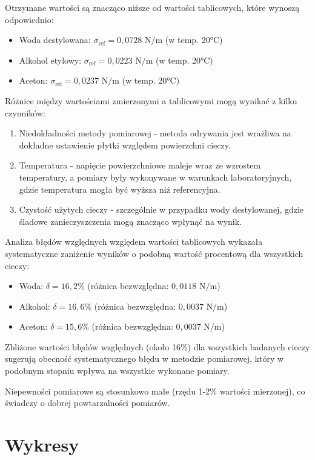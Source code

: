 \documentclass[a4paper,12pt]{article}
\begin{document}
Otrzymane wartości są znacząco niższe od wartości tablicowych, które wynoszą odpowiednio:
\begin{itemize}
    \item Woda destylowana: $\sigma_{\text{ref}} = 0{,}0728 \text{ N/m}$ (w temp. 20°C)
    \item Alkohol etylowy: $\sigma_{\text{ref}} = 0{,}0223 \text{ N/m}$ (w temp. 20°C)
    \item Aceton: $\sigma_{\text{ref}} = 0{,}0237 \text{ N/m}$ (w temp. 20°C)
\end{itemize}

Różnice między wartościami zmierzonymi a tablicowymi mogą wynikać z kilku czynników:

\begin{enumerate}
    \item Niedokładności metody pomiarowej - metoda odrywania jest wrażliwa na dokładne ustawienie płytki względem powierzchni cieczy.
    \item Temperatura - napięcie powierzchniowe maleje wraz ze wzrostem temperatury, a pomiary były wykonywane w warunkach laboratoryjnych, gdzie temperatura mogła być wyższa niż referencyjna.
    \item Czystość użytych cieczy - szczególnie w przypadku wody destylowanej, gdzie śladowe zanieczyszczenia mogą znacząco wpłynąć na wynik.
\end{enumerate}

Analiza błędów względnych względem wartości tablicowych wykazała systematyczne zaniżenie wyników o podobną wartość procentową dla wszystkich cieczy:
\begin{itemize}
    \item Woda: $\delta = 16{,}2\%$ (różnica bezwzględna: $0{,}0118 \text{ N/m}$)
    \item Alkohol: $\delta = 16{,}6\%$ (różnica bezwzględna: $0{,}0037 \text{ N/m}$)
    \item Aceton: $\delta = 15{,}6\%$ (różnica bezwzględna: $0{,}0037 \text{ N/m}$)
\end{itemize}

Zbliżone wartości błędów względnych (około 16\%) dla wszystkich badanych cieczy sugerują obecność systematycznego błędu w metodzie pomiarowej, który w podobnym stopniu wpływa na wszystkie wykonane pomiary.

Niepewności pomiarowe są stosunkowo małe (rzędu 1-2\% wartości mierzonej), co świadczy o dobrej powtarzalności pomiarów.

\section{Wykresy}



\end{document}

